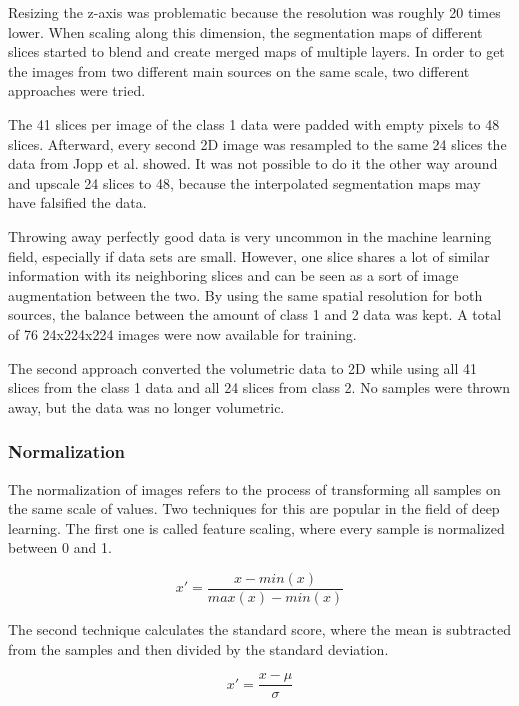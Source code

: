Resizing the z-axis was problematic because the resolution was roughly 20 times lower. When scaling along this dimension, the segmentation maps of different slices started to blend and create merged maps of multiple layers. In order to get the images from two different main sources on the same scale, two different approaches were tried.

The 41 slices per image of the class 1 data were padded with empty pixels to 48 slices. Afterward, every second 2D image was resampled to the same 24 slices the data from Jopp et al. showed. It was not possible to do it the other way around and upscale 24 slices to 48, because the interpolated segmentation maps may have falsified the data.

Throwing away perfectly good data is very uncommon in the machine learning field, especially if data sets are small. However, one slice shares a lot of similar information with its neighboring slices and can be seen as a sort of image augmentation between the two. By using the same spatial resolution for both sources, the balance between the amount of class 1 and 2 data was kept. A total of 76 24x224x224 images were now available for training.

The second approach converted the volumetric data to 2D while using all 41 slices from the class 1 data and all 24 slices from class 2. No samples were thrown away, but the data was no longer volumetric. 

\subsubsection{Normalization}

The normalization of images refers to the process of transforming all samples on the same scale of values. Two techniques for this are popular in the field of deep learning. The first one is called feature scaling, where every sample is normalized between 0 and 1.

\[x' = \frac {x - min(x)}{max(x) - min(x)}\]

The second technique calculates the standard score, where the mean is subtracted from the samples and then divided by the standard deviation.

\[x' = \frac {x - \mu}{\sigma}\]

